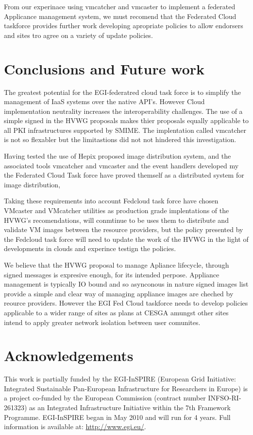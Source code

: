 \documentclass{llncs_Ibergrid2013}
\begin{document}
From our experinace using vmcatcher and vmcaster to implement a federated Applicance management system, we must recomend that the Federated Cloud taskforce provides further work developing apropriate policies to allow endorsers and sites tro agree on a variety of update policies. 

\section{Conclusions and Future work}
\label{sect-conclusions}
The greatest potential for the EGI-federatred cloud task force is to simplify the management of IaaS systems over the native API's.
However Cloud implementation neutrality increases the interoperability challenges. The use of a simple signed in the HVWG proposals makes thier proposals equally applicable to all PKI infrastructures supported by SMIME. The implentation called vmcatcher is not so flexabler but the limitastions did not not hindered this investigation.

Having tested the use of Hepix proposed image distribution system, and the associated tools vmcatcher and vmcaster and the event handlers developed my the Federated Cloud Task force have proved themself as a distributed system for image distribution, 

Taking these requirements into account Fedcloud task force have chosen VMcaster and VMcatcher utilities as production grade implentations of the HVWG's recomendations, will conmtinue to be uses them to distribute and validate VM images between the resource providers, but the policy presented by the Fedcloud task force will need to update the work of the HVWG in the light of developments in clouds and experince testign the policies.

We believe that the HVWG proposal to manage Apliance lifecycle, through signed messages is expresive enough, for its intended perpose. Appliance management is typically IO bound and so asynconous in nature signed images list provide a simple and clear way of managing appliance images are cheched by reource providers. However the EGI Fed Cloud taskforce needs to develop policies applicable to a wider range of sites as plans at CESGA amungst other sites intend to apply greater network isolation between user comunites.
\section*{Acknowledgements}
\label{sect-acknowledgements}
This work is partially funded by the  EGI-InSPIRE (European Grid Initiative: Integrated Sustainable
Pan-European Infrastructure for Researchers in Europe) is a project co-funded by the European Commission 
(contract number INFSO-RI-261323) as an Integrated Infrastructure Initiative within the 7th Framework 
Programme. EGI-InSPIRE began in May 2010 and will run for 4 years. Full information is available at:
\url{http://www.egi.eu/}.
\end{document}
